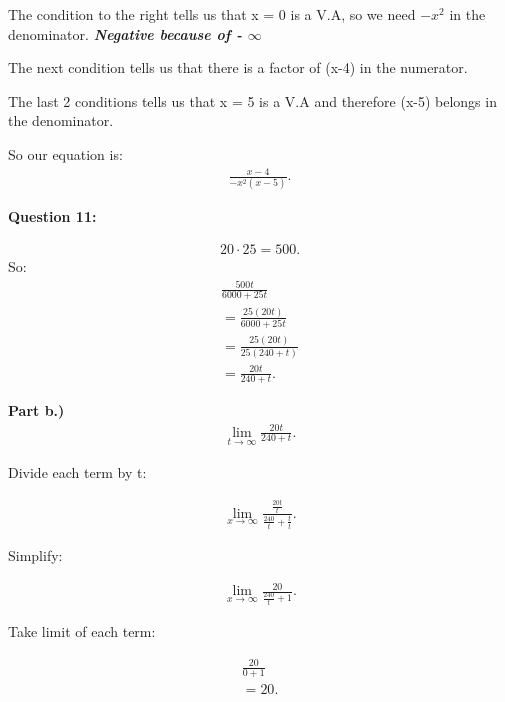 \documentclass{report}
\begin{document}
    \bigbreak \noindent 
    The condition to the right tells us that x = 0 is a V.A, so we need $-x^2$ in the denominator. \textbf{\textit{Negative because of - $\infty$}}

    \bigbreak \noindent 
    The next condition tells us that there is a factor of (x-4) in the numerator.

    \bigbreak \noindent 
    The last 2 conditions tells us that x = 5 is a V.A and therefore (x-5) belongs in the denominator.

    \bigbreak \noindent 
    So our equation is:
    \begin{align*}
        \frac{x-4}{-x^2 \left(x-5\right)}
    .\end{align*}

    \bigbreak \noindent \bigbreak \noindent \bigbreak \noindent 
    \begin{Large}
        \textbf{Question 11:}
    \end{Large}

    \bigbreak \noindent 
    \bigbreak \noindent 
    \begin{align*}
        20 \cdot 25 = 500
    .\end{align*}
    \bigbreak \noindent 
    So:
    \begin{align*}
        \frac{500t}{6000+25t} \\ 
        = \frac{25 \left(20t\right)}{6000 + 25t} \\ 
        = \frac{25 \left(20t\right)}{25 \left(240 + t\right)} \\ 
        = \frac{20t}{240+t}
    .\end{align*}

    \bigbreak \noindent 
    \textbf{Part b.)}
    \bigbreak \noindent 
    \begin{align*}
        \lim\limits_{t \to \infty}{ \frac{20t}{240 + t}}
    .\end{align*}

    \bigbreak \noindent 
    Divide each term by t:

    \begin{align*}
        \lim\limits_{x \to \infty}{ \frac{ \frac{20t}{t}}{ \frac{240}{t} + \frac{t}{t}}}    
    .\end{align*}

    \bigbreak \noindent 
    Simplify:

    \begin{align*}
        \lim\limits_{x \to \infty}{ \frac{20}{ \frac{240}{t} + 1}}
    .\end{align*}

    \bigbreak \noindent 
    Take limit of each term:

    \begin{align*}
        \frac{20}{0 + 1} \\ 
        = 20
    .\end{align*}
\end{document}
